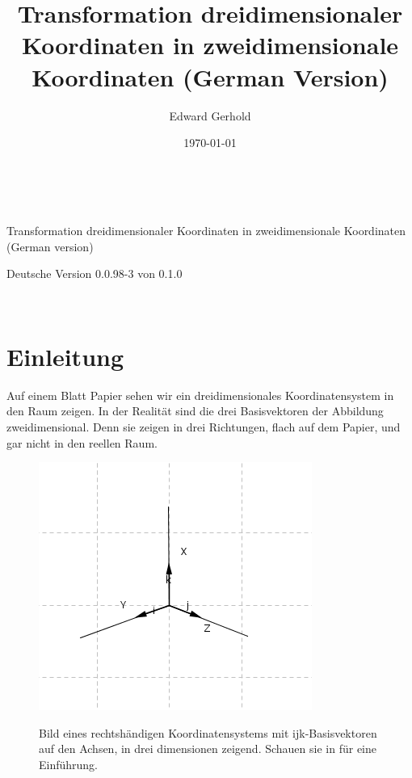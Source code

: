 \documentclass[a4paper]{article}
\begin{document}
\begin{center}
\title{Transformation dreidimensionaler Koordinaten in zweidimensionale Koordinaten (German Version)}\\
\author{Edward Gerhold}
Transformation dreidimensionaler Koordinaten in zweidimensionale Koordinaten (German version)\\
\date{\today}
\maketitle


Deutsche Version 0.0.98-3 von 0.1.0\\

\end{center} 

\tableofcontents\\

\section{Einleitung}

Auf einem Blatt Papier sehen wir ein dreidimensionales Koordinatensystem in den Raum zeigen.
In der Realit\"at sind die drei Basisvektoren der Abbildung zweidimensional. Denn sie zeigen 
in drei Richtungen, flach auf dem Papier, und gar nicht in den reellen Raum.\\

\begin{figure}[ht]
\label{ijksystem}
\includegraphics[scale=2]{ijksystem.png}\\
\caption{Bild eines rechtsh\"andigen Koordinatensystems mit ijk-Basisvektoren auf den Achsen, in drei dimensionen zeigend. Schauen sie in \cite{Corral1} f\"ur eine Einf\"uhrung.}
\end{figure}
\end{document}
